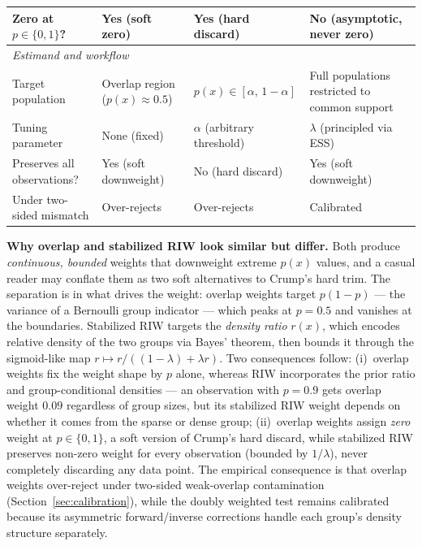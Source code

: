 \begin{table}[t]
\begin{tabular}{lp{4.8cm}p{4.8cm}p{4.8cm}}
    \hspace{1em} Zero at $p\in\{0,1\}$?
    & Yes (soft zero)
    & Yes (hard discard)
    & No (asymptotic, never zero) \\
    \midrule
    \multicolumn{4}{l}{\textit{Estimand and workflow}} \\
    \hspace{1em} Target population
    & Overlap region ($p(x)\approx 0.5$)
    & $p(x)\in[\alpha,\,1-\alpha]$
    & Full populations restricted to common support \\
    \hspace{1em} Tuning parameter
    & None (fixed)
    & $\alpha$ (arbitrary threshold)
    & $\lambda$ (principled via ESS) \\
    \hspace{1em} Preserves all observations?
    & Yes (soft downweight)
    & No (hard discard)
    & Yes (soft downweight) \\
    \hspace{1em} Under two-sided mismatch
    & Over-rejects
    & Over-rejects
    & Calibrated \\
    \bottomrule
  \end{tabular}

  \vspace{0.5em}
  \small
  \textbf{Why overlap and stabilized RIW look similar but differ.}
  Both produce \emph{continuous, bounded} weights that downweight extreme $p(x)$ values,
  and a casual reader may conflate them as two soft alternatives to Crump's hard trim.
  The separation is in what drives the weight:
  overlap weights target $p(1-p)$ --- the variance of a Bernoulli group indicator --- which
  peaks at $p=0.5$ and vanishes at the boundaries.
  Stabilized RIW targets the \emph{density ratio} $r(x)$, which encodes relative density of
  the two groups via Bayes' theorem, then bounds it through the sigmoid-like map
  $r \mapsto r/((1-\lambda)+\lambda r)$.
  Two consequences follow:
  (i)~overlap weights fix the weight shape by $p$ alone, whereas RIW incorporates
  the prior ratio and group-conditional densities --- an observation with $p=0.9$ gets
  overlap weight $0.09$ regardless of group sizes, but its stabilized RIW weight depends
  on whether it comes from the sparse or dense group;
  (ii)~overlap weights assign \emph{zero} weight at $p\in\{0,1\}$, a soft version of
  Crump's hard discard, while stabilized RIW preserves non-zero weight for every
  observation (bounded by $1/\lambda$), never completely discarding any data point.
  The empirical consequence is that overlap weights over-reject under two-sided weak-overlap
  contamination (Section~\ref{sec:calibration}), while the doubly weighted test remains
  calibrated because its asymmetric forward/inverse corrections handle each group's
  density structure separately.
\end{table}
